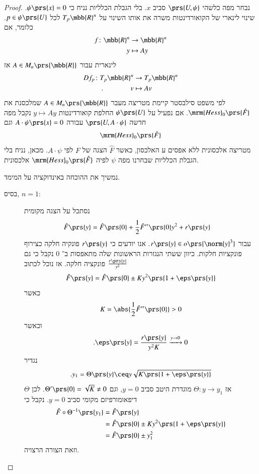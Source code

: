 \documentclass[a4paper,10pt,twoside,openany]{book}
\begin{document}
\begin{proof}
נבחר מפה כלשהי
$\prs{U,\psi}$
סביב
$x$.
בלי הגבלת הכלליות נניח כי
$\psi\prs{x} = 0$.
שינוי לינארי של הקואורדינטות משרה את אותו השינוי על
$T_p \mbb{R}^n$
לכל
$p \in \psi\prs{U}$.
כלומר, אם
\begin{align*}
f \colon \mbb{R}^n &\to \mbb{R}^n \\
y &\mapsto A y
\end{align*}
לינארית עבור
$A \in M_n\prs{\mbb{R}}$
אז
\begin{align*}
D f_p \colon T_p \mbb{R}^n &\to T_p \mbb{R}^n \\
\text{.} \hphantom{lalalalala} v &\mapsto A v
\end{align*}
לפי משפט סילבסטר קיימת מטריצה מעבר
$A \in M_n\prs{\mbb{R}}$
שמלכסנת את
$\mrm{Hess}_0\prs{\hat{F}}$.
אם נפעיל על
$\psi\prs{U}$
החלפת קואורדינטות
$y \mapsto Ay$
נקבל מפה חדשה
$\prs{U, A \cdot \psi}$
עבורה
$A \cdot \psi\prs{x} = 0$
וגם
\[\mrm{Hess}_0\prs{\hat{F}}\]
מטריצה אלכסונית ללא אפסים ע האלכסון, כאשר
$\hat{F}$
הצגה של
$F$
לפי
$A \cdot \psi$.
מכאן, נניח בלי הגבלת הכלליות שבחרנו מפה
$\psi$
לפיה
$\mrm{Hess}_0\prs{\hat{F}}$
אלכסונית.

נמשיך את ההוכחה באינדוקציה על המימד.

\begin{description}
\item[בסיס, $n = 1$:]
נסתכל על הצגה מקומית
\begin{align*}
\hat{F}\prs{y} &= \hat{F}\prs{0} + \frac{1}{2} \hat{F}''\prs{0} y^2 + r\prs{y}
\end{align*}
עבור
$r\prs{y} \in o\prs{\norm{y}^3}$.
אנו יודעים כי
$r\prs{y}$
פונקיה חלקה כצירוף פונקציות חלקות.
כיוון ששתי הנגזרות הראשונות שלה מתאפסות ב־%
$0$
נקבל כי גם
$\frac{r\prs{y}}{y^2}$
פונקציה חלקה.
אז נוכל לכתוב
\begin{align*}
\hat{F}\prs{y} = \hat{F}\prs{0} \pm K y^2 \prs{1 + \eps\prs{y}}
\end{align*}
כאשר
\[K = \abs{\frac{1}{2} \hat{F}''\prs{0}} > 0\]
וכאשר
\[\text{.} \eps\prs{y} = \frac{r\prs{y}}{y^2 K} \xrightarrow{y\to 0} 0\]
נגדיר
\[\text{.} y_1 = \Theta\prs{y} \ceq y \sqrt{K\prs{1+\eps\prs{y}}}\]
אז
$\Theta \colon y \to y_1$
מוגדרת היטב סביב
$y = 0$,
וגם
$\Theta'\prs{0} = \sqrt{K} \neq 0$.
לכן
$\Theta$
דיפאומורפיזם מקומי סביב
$y = 0$.
נקבל כי
\begin{align*}
\hat{F} \circ \Theta^{-1}\prs{y_1} &= \hat{F}\prs{y}
\\&=
\hat{F}\prs{0} \pm K y^2 \prs{1 + \eps\prs{y}}
\\&=
\hat{F}\prs{0} \pm y_1^2
\end{align*}
וזאת הצורה הרצויה.


\end{description}
\end{proof}
\end{document}

